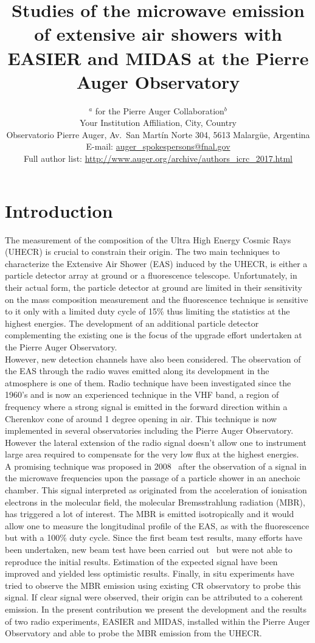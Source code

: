 \documentclass{PoS}
\title{Studies of the microwave emission of extensive air showers with EASIER and MIDAS at the Pierre Auger Observatory}
\author{\speaker{Romain Gaior}$^a$ for the Pierre Auger Collaboration$^b$\\
\llap{$^a$}Your Institution Affiliation, City, Country\\
\llap{$^b$}Observatorio Pierre Auger, Av.\ San Mart\'in Norte 304, 5613 Malarg\"ue, Argentina\\
E-mail: \href{mailto:auger_spokespersons@fnal.gov}{\rm auger\_spokespersons@fnal.gov}\\
Full author list: \href{http://www.auger.org/archive/authors_icrc_2017.html}{\rm http://www.auger.org/archive/authors\_icrc\_2017.html}}
\begin{document}
\section{Introduction}
The measurement of the composition of the Ultra High Energy Cosmic Rays (UHECR) is crucial to constrain their origin. The two main techniques to characterize the Extensive Air Shower (EAS) induced by the UHECR, is either a particle detector array at ground or a fluorescence telescope. Unfortunately, in their actual form, the particle detector at ground are limited in their sensitivity on the mass composition measurement and the fluorescence technique is sensitive to it only with a limited duty cycle of 15\% thus limiting the statistics at the highest energies. The development of 
an additional particle detector complementing the existing one is the focus of the upgrade effort undertaken at the Pierre Auger Observatory\cite{augerupgrade}.\\However, new detection channels have also been considered. The observation of the EAS through the radio waves emitted along its development in the atmosphere is one of them. Radio technique have been investigated since the 1960's and is now an experienced technique in the VHF band, a region of frequency where a strong signal is emitted in the forward direction within a Cherenkov cone of around 1 degree opening in air. This technique is now implemented in several observatories including the Pierre Auger Observatory. However the lateral extension of the radio signal doesn't allow one to instrument large area required to compensate for the very low flux at the highest energies.\\ A promising technique was proposed in 2008~\cite{gorham} after the observation of a signal in the microwave frequencies upon the passage of a particle shower in an anechoic chamber. This signal interpreted as originated from the acceleration of ionisation electrons in the molecular field, the molecular Bremsstrahlung radiation (MBR), has triggered a lot of interest. The MBR is emitted isotropically and it would allow one to measure the longitudinal profile of the EAS, as with the fluorescence but with a 100\% duty cycle. Since the first beam test results, many efforts have been undertaken, new beam test have been carried out~\cite{amy, maybe} but were not able to reproduce the initial results. Estimation of the expected signal have been improved and yielded less optimistic results. Finally, in situ experiments have tried to observe the MBR emission using existing CR observatory to probe this signal\cite{crome, icrc2013}. If clear signal were observed, their origin can be attributed to a coherent emission. In the present contribution we present the development and the results of two radio experiments, EASIER and MIDAS, installed within the Pierre Auger Observatory and able to probe the MBR emission from the UHECR.
\end{document}
